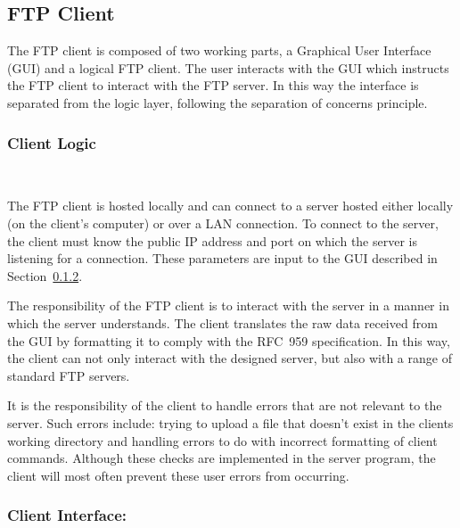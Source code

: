 \documentclass[10pt,twocolumn]{witseiepaper}
\begin{document}
\subsection{FTP Client}

The FTP client is composed of two working parts, a Graphical User Interface (GUI) and a logical FTP client. The user interacts with the GUI which instructs the FTP client to interact with the FTP server. In this way the interface is separated from the logic layer, following the separation of concerns principle.

\subsubsection{Client Logic} $     $

The FTP client is hosted locally and can connect to a server hosted either locally (on the client's computer) or over a LAN connection. To connect to the server, the client must know the public IP address and port on which the server is listening for a connection. These parameters are input to the GUI described in Section~\ref{GUI}.

The responsibility of the FTP client is to interact with the server in a manner in which the server understands. The client translates the raw data received from the GUI by formatting it to comply with the RFC~959 specification. In this way, the client can not only interact with the designed server, but also  with a range of standard FTP servers.

It is the responsibility of the client to handle errors that are not relevant to the server. Such errors include: trying to upload a file that doesn't exist in the clients working directory and handling errors to do with incorrect formatting of client commands. Although these checks are implemented in the server program, the client will most often prevent these user errors from occurring.

\subsubsection{Client Interface: }\label{GUI} $     $




\end{document}
